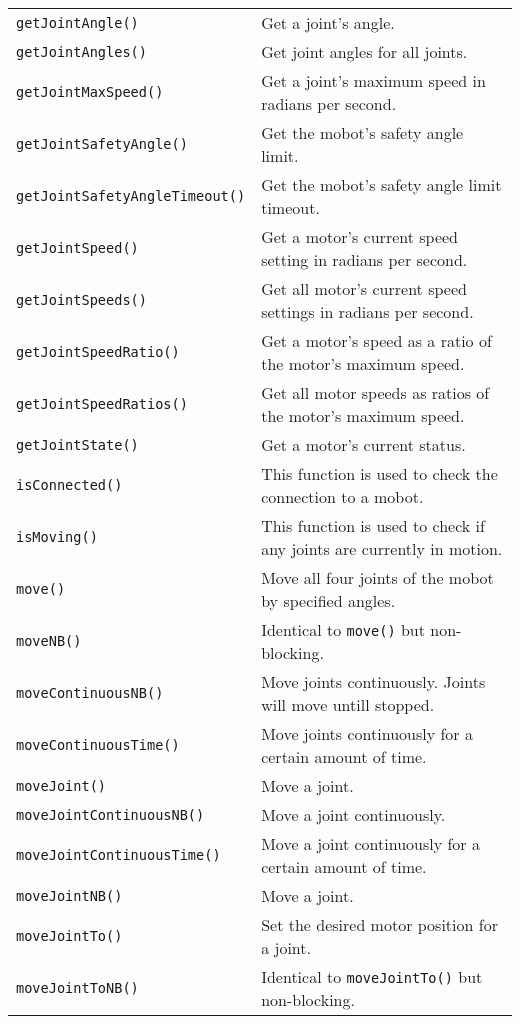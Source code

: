 \begin{table}[!h]
\begin{center}
\begin{tabular}{p{48 mm}p{110 mm}}
\texttt{getJointAngle()} & Get a joint's angle. \\
\texttt{getJointAngles()} & Get joint angles for all joints. \\
\texttt{getJointMaxSpeed()} & Get a joint's maximum speed in radians per second. \\
\texttt{getJointSafetyAngle()} & Get the mobot's safety angle limit. \\
\texttt{getJointSafetyAngleTimeout()} & Get the mobot's safety angle limit timeout. \\
\texttt{getJointSpeed()} & Get a motor's current speed setting in radians per second. \\
\texttt{getJointSpeeds()} & Get all motor's current speed settings in radians per second. \\
\texttt{getJointSpeedRatio()} & Get a motor's speed as a ratio of the motor's maximum speed. \\
\texttt{getJointSpeedRatios()} & Get all motor speeds as ratios of the motor's maximum speed. \\
\texttt{getJointState()} & Get a motor's current status. \\
\texttt{isConnected()} & This function is used to check the connection to a mobot. \\
\texttt{isMoving()} & This function is used to check if any joints are currently in motion. \\
\texttt{move()} & Move all four joints of the mobot by specified angles. \\
\texttt{moveNB()} & Identical to \texttt{move()} but non-blocking. \\
\texttt{moveContinuousNB()} & Move joints continuously. Joints will move untill stopped.\\
\texttt{moveContinuousTime()} & Move joints continuously for a certain amount of time.\\
\texttt{moveJoint()} & Move a joint. \\
\texttt{moveJointContinuousNB()} & Move a joint continuously. \\
\texttt{moveJointContinuousTime()} & Move a joint continuously for a certain amount of time. \\
\texttt{moveJointNB()} & Move a joint. \\
\texttt{moveJointTo()} & Set the desired motor position for a joint. \\
\texttt{moveJointToNB()} & Identical to \texttt{moveJointTo()} but non-blocking. \\

\end{tabular}
\end{center}
\end{table}
